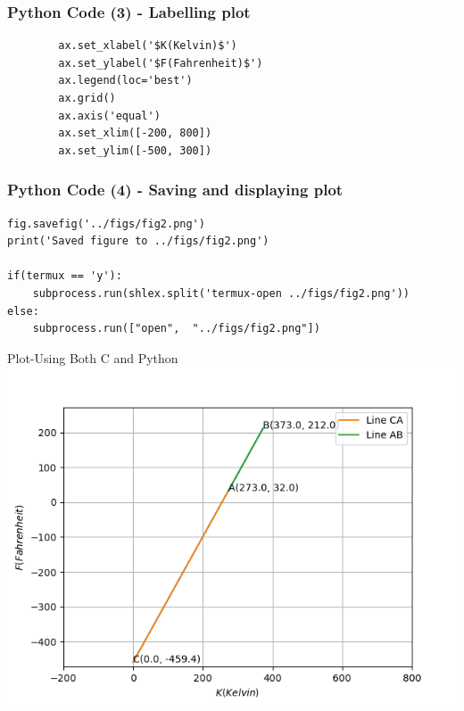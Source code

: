 \documentclass{beamer}
\begin{document}
\begin{frame}[fragile]
    \frametitle{Python Code (3) - Labelling plot}
    \begin{lstlisting}
        ax.set_xlabel('$K(Kelvin)$')
        ax.set_ylabel('$F(Fahrenheit)$')
        ax.legend(loc='best')
        ax.grid() 
        ax.axis('equal')
        ax.set_xlim([-200, 800])
        ax.set_ylim([-500, 300])
    \end{lstlisting}
\end{frame}

\begin{frame}[fragile]
    \frametitle{Python Code (4) - Saving and displaying plot}
    \begin{lstlisting}
fig.savefig('../figs/fig2.png')
print('Saved figure to ../figs/fig2.png')

if(termux == 'y'):
    subprocess.run(shlex.split('termux-open ../figs/fig2.png'))
else:
    subprocess.run(["open",  "../figs/fig2.png"])
\end{lstlisting}
\end{frame}

\begin{frame}{Plot-Using Both C and Python}
    \centering
    \includegraphics[width=\columnwidth, height=0.8\textheight, keepaspectratio]{../figs/fig2.png}     
\end{frame}
\end{document}
